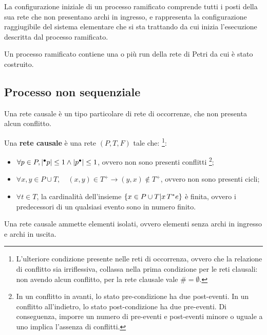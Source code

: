 \begin{rem}
    La configurazione iniziale di un processo ramificato comprende tutti i
    posti della sua rete che non presentano archi in ingresso, e rappresenta
    la configurazione raggiugibile del sistema elementare che si sta trattando
    da cui inizia l'esecuzione descritta dal processo ramificato.
\end{rem}

\begin{rem}
    Un processo ramificato contiene una o più run della rete di Petri da cui
    è stato costruito.
\end{rem}

\subsection*{Processo non sequenziale}
Una rete causale è un tipo particolare di rete di occorrenze, che non presenta
alcun conflitto.\\
\begin{defn}
    Una \textbf{rete causale} è una rete $(P, T, F)$ tale che:
    \footnote[][-1cm]{L'ulteriore condizione presente nelle reti di occorrenza,
    ovvero che la relazione di conflitto sia irriflessiva, collassa nella prima
    condizione per le reti clausali: non avendo alcun conflitto, per la rete
    clausale vale $\# = \emptyset$.}:
    \begin{itemize}
        \item $\forall p \in P, \lvert {^\bullet}p \rvert \le 1 \land \lvert p^\bullet \rvert \le 1$,
        ovvero non sono presenti conflitti \footnote[][1cm]{In un conflitto in
        avanti, lo stato pre-condizione ha due post-eventi. In un conflitto
        all'indietro, lo stato post-condizione ha due pre-eventi. Di conseguenza,
        imporre un numero di pre-eventi e post-eventi minore o uguale a uno implica
        l'assenza di conflitti.};
        \item $\forall x, y \in P \cup T, \quad (x, y) \in T^+ \rightarrow (y, x) \notin T^+$,
        ovvero non sono presenti cicli;
        \item $\forall t \in T$, la cardinalità dell'insieme $\left\{x \in P \cup T | x \, T^* e\right\}$
        è finita, ovvero i predecessori di un qualsiasi evento sono in numero
        finito.
    \end{itemize}
\end{defn}

\begin{rem}
    Una rete causale ammette elementi isolati, ovvero elementi senza archi
    in ingresso e archi in uscita.
\end{rem}

